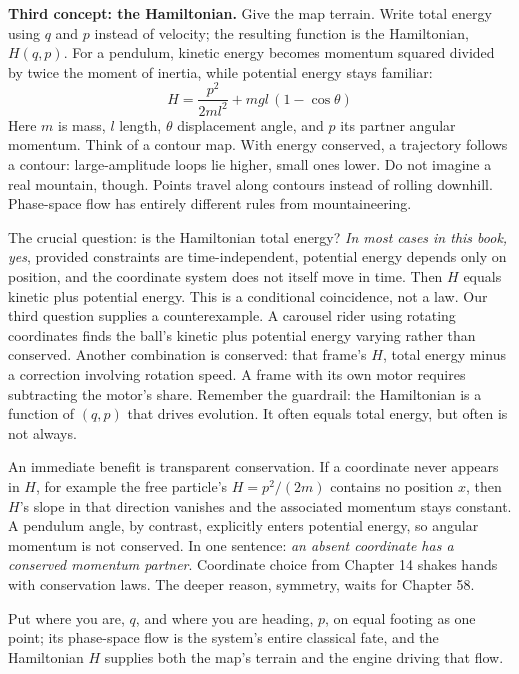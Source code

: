 \begin{mainline}
\textbf{Third concept: the Hamiltonian.} Give the map terrain. Write total energy using \(q\) and \(p\) instead of velocity; the resulting function is the Hamiltonian, \(H(q,p)\). For a pendulum, kinetic energy becomes momentum squared divided by twice the moment of inertia, while potential energy stays familiar:
\[
  H = \frac{p^{2}}{2ml^{2}} + mgl\,(1-\cos\theta)
\]
Here \(m\) is mass, \(l\) length, \(\theta\) displacement angle, and \(p\) its partner angular momentum. Think of a contour map. With energy conserved, a trajectory follows a contour: large-amplitude loops lie higher, small ones lower. Do not imagine a real mountain, though. Points travel along contours instead of rolling downhill. Phase-space flow has entirely different rules from mountaineering.

The crucial question: is the Hamiltonian total energy? \emph{In most cases in this book, yes}, provided constraints are time-independent, potential energy depends only on position, and the coordinate system does not itself move in time. Then \(H\) equals kinetic plus potential energy. This is a conditional coincidence, not a law. Our third question supplies a counterexample. A carousel rider using rotating coordinates finds the ball's kinetic plus potential energy varying rather than conserved. Another combination is conserved: that frame's \(H\), total energy minus a correction involving rotation speed. A frame with its own motor requires subtracting the motor's share. Remember the guardrail: the Hamiltonian is a function of \((q,p)\) that drives evolution. It often equals total energy, but often is not always.

An immediate benefit is transparent conservation. If a coordinate never appears in \(H\), for example the free particle's \(H=p^{2}/(2m)\) contains no position \(x\), then \(H\)'s slope in that direction vanishes and the associated momentum stays constant. A pendulum angle, by contrast, explicitly enters potential energy, so angular momentum is not conserved. In one sentence: \emph{an absent coordinate has a conserved momentum partner}. Coordinate choice from Chapter 14 shakes hands with conservation laws. The deeper reason, symmetry, waits for Chapter 58.
\end{mainline}


\begin{oneline}
Put where you are, \(q\), and where you are heading, \(p\), on equal footing as one point; its phase-space flow is the system's entire classical fate, and the Hamiltonian \(H\) supplies both the map's terrain and the engine driving that flow.
\end{oneline}

